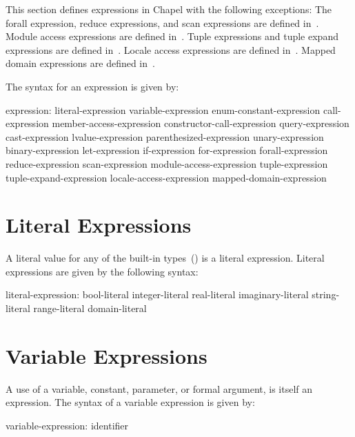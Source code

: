 \label{Expressions}

This section defines expressions in Chapel with the following
exceptions: The forall expression, reduce expressions, and scan
expressions are defined in~.  Module access
expressions are defined in~.  Tuple expressions
and tuple expand expressions are defined in~.  Locale
access expressions are defined
in~.  Mapped domain
expressions are defined in~.

The syntax for an expression is given by:
\begin{syntax}
expression:
  literal-expression
  variable-expression
  enum-constant-expression
  call-expression
  member-access-expression
  constructor-call-expression
  query-expression
  cast-expression
  lvalue-expression
  parenthesized-expression
  unary-expression
  binary-expression
  let-expression
  if-expression
  for-expression
  forall-expression
  reduce-expression
  scan-expression
  module-access-expression
  tuple-expression
  tuple-expand-expression
  locale-access-expression
  mapped-domain-expression
\end{syntax}

\section{Literal Expressions}
\label{Literal_Expressions}

A literal value for any of the built-in
types~() is a literal expression.
Literal expressions are given by the following syntax:
\begin{syntax}
literal-expression:
  bool-literal
  integer-literal
  real-literal
  imaginary-literal
  string-literal
  range-literal
  domain-literal
\end{syntax}

\section{Variable Expressions}
\label{Variable_Expressions}

A use of a variable, constant, parameter, or formal argument, is
itself an expression.  The syntax of a variable expression is given
by:
\begin{syntax}
variable-expression:
  identifier
\end{syntax}

